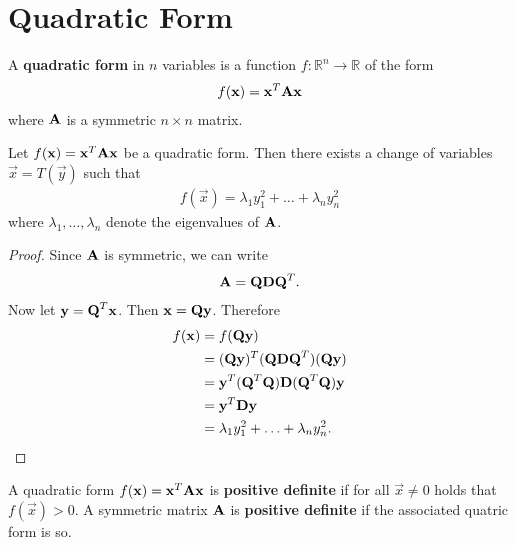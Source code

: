 \documentclass{memoir}
\begin{document}
\section{Quadratic Form}
\begin{definition}
    A \textbf{quadratic form} in $n$ variables is a function $f: \mathbb{R}^n \to \mathbb{R}$ of the form
    \begin{align*}
        f(\boldsymbol{\mathbf{x}}) = \boldsymbol{\mathbf{x}}^T \boldsymbol{\mathbf{A}} \boldsymbol{\mathbf{x}}
    \end{align*}
    where $\boldsymbol{\mathbf{A}}$ is a symmetric $n \times n$ matrix.
\end{definition}

\begin{theorem}
    Let $f(\boldsymbol{\mathbf{x}})=\boldsymbol{\mathbf{x}}^T \boldsymbol{\mathbf{A}} \boldsymbol{\mathbf{x}}$ be a quadratic form. Then there exists a change of variables $\vec{x} = T(\vec{y})$ such that
    \begin{align*}
        f(\vec{x}) = \lambda_1 y_1^2 + \ldots + \lambda_n y_n^2
    \end{align*}
    where $\lambda_1, \ldots, \lambda_n$ denote the eigenvalues of $\boldsymbol{\mathbf{A}}$.
\end{theorem}
\begin{proof}
    Since $\boldsymbol{\mathbf{A}}$ is symmetric, we can write
    \begin{align*}
        \boldsymbol{\mathbf{A}} = \boldsymbol{\mathbf{Q}} \boldsymbol{\mathbf{D}} \boldsymbol{\mathbf{Q}}^T.
    \end{align*}
    Now let $\boldsymbol{\mathbf{y}} = \boldsymbol{\mathbf{Q}}^T \boldsymbol{\mathbf{x}}$. Then $\boldsymbol{\mathbf{x}} = \boldsymbol{\mathbf{Q}} \boldsymbol{\mathbf{y}}$. Therefore
    \begin{align*}
        f(\boldsymbol{\mathbf{x}}) &= f(\boldsymbol{\mathbf{Q}} \boldsymbol{\mathbf{y}}) \\
        &= (\boldsymbol{\mathbf{Q}} \boldsymbol{\mathbf{y}})^T (\boldsymbol{\mathbf{Q}} \boldsymbol{\mathbf{D}} \boldsymbol{\mathbf{Q}}^T) (\boldsymbol{\mathbf{Q}} \boldsymbol{\mathbf{y}}) \\
        &= \boldsymbol{\mathbf{y}}^T (\boldsymbol{\mathbf{Q}}^T \boldsymbol{\mathbf{Q}}) \boldsymbol{\mathbf{D}} (\boldsymbol{\mathbf{Q}}^T \boldsymbol{\mathbf{Q}}) \boldsymbol{\mathbf{y}} \\
        &= \boldsymbol{\mathbf{y}}^T \boldsymbol{\mathbf{D}} \boldsymbol{\mathbf{y}} \\
        &= \lambda_1 y_1^2 + \ldots + \lambda_n y_n^2.
    \end{align*}
\end{proof}

\begin{definition}
    A quadratic form $f(\boldsymbol{\mathbf{x}}) = \boldsymbol{\mathbf{x}}^T \boldsymbol{\mathbf{A}} \boldsymbol{\mathbf{x}}$ is \textbf{positive definite} if for all $\vec{x} \neq 0$ holds that $f(\vec{x}) > 0$. A symmetric matrix $\boldsymbol{\mathbf{A}}$ is \textbf{positive definite} if the associated quatric form is so.
\end{definition}
\end{document}
